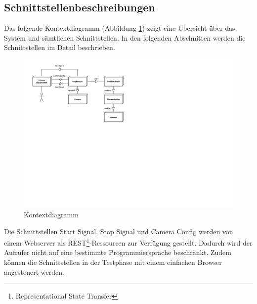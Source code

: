 \subsection{Schnittstellenbeschreibungen}
Das folgende Kontextdiagramm (Abbildung \ref{fig:kontextdiagramm}) zeigt eine Übersicht über das System und sämtlichen Schnittstellen. In den folgenden Abschnitten werden die Schnittstellen im Detail beschrieben.

\begin{figure}[h!]
	\centering
	\includegraphics[width=0.9\linewidth]{../../fig/kontextdiagramm}
	\caption{Kontextdiagramm}
	\label{fig:kontextdiagramm}
\end{figure}

Die Schnittstellen Start Signal, Stop Signal und Camera Config werden von einem Webserver als REST\footnote{Representational State Transfer}-Ressourcen zur Verfügung gestellt. Dadurch wird der Aufrufer nicht auf eine bestimmte Programmiersprache beschränkt. Zudem können die Schnittstellen in der Testphase mit einem einfachen Browser angesteuert werden.





\newpage



\newpage




\newpage


